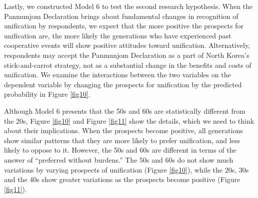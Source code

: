 \documentclass[letterpaper,9pt,twocolumn,twoside,]{pinp}
\begin{document}
Lastly, we constructed Model 6 to test the second research hypothesis.
When the Panmunjom Declaration brings about fundamental changes in
recognition of unification by respondents, we expect that the more
positive the prospects for unification are, the more likely the
generations who have experienced past cooperative events will show
positive attitudes toward unification. Alternatively, respondents may
accept the Panmunjom Declaration as a part of North Korea's
stick-and-carrot strategy, not as a substantial change in the benefits
and costs of unification. We examine the interactions between the two
variables on the dependent variable by changing the prospects for
unification by the predicted probability in Figure \ref{fig10}.

Although Model 6 presents that the 50s and 60s are statistically
different from the 20s, Figure \ref{fig10} and Figure \ref{fig11} show
the details, which we need to think about their implications. When the
prospects become positive, all generations show similar patterns that
they are more likely to prefer unification, and less likely to oppose to
it. However, the 50s and 60s are different in terms of the answer of
``preferred without burdens.'' The 50s and 60s do not show much
variations by varying prospects of unification (Figure \ref{fig10}),
while the 20s, 30s and the 40s show greater variations as the prospects
become positive (Figure \ref{fig11}).
\end{document}
